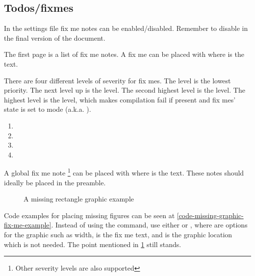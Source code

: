 \subsection{Todos/fixmes}
\label{fixmes-section}
In the settings file  fix me notes can be enabled/disabled.
Remember to disable in the final version of the document.

The first page is a list of fix me notes. 
A fix me can be placed
with  where  is the text.

There are four different levels of severity for fix mes.
The  level is the lowest priority.
The next level up is the  level.
The second highest level is the  level.
The highest level is the  level, 
which makes compilation fail if present
and fix mes' state is set to  mode (a.k.a. ).

\begin{enumerate}
    \item {}
    \item {}
    \item {}
    \item {}
\end{enumerate}

A global fix me note%
\footnote{\label{all-severity-levels-supported}Other severity levels are also supported}
can be placed with 
 where  is the text.
These notes should ideally be placed in the preamble.

\begin{figure}
    \centering
    
    \caption{A missing rectangle graphic example}
\end{figure}

Code examples for placing missing figures can be seen at
\cref{code-missing-graphic-fix-me-example}.
Instead of using the 
command, use either 
or ,
where  are options for the graphic such as width,
 is the fix me text,
and  is the graphic location which is not needed.
The point mentioned in \cref{all-severity-levels-supported} still stands.
